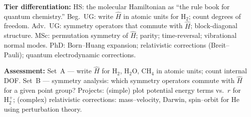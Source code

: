 \documentclass[11pt,a4paper]{article}
\begin{document}
\begin{tcolorbox}[chembox, title={Module~III.1 / L01: The Molecular Hamiltonian}]
\medskip\textbf{Tier differentiation:}
HS: the molecular Hamiltonian as ``the rule book for quantum chemistry.''
Beg.\ UG: write $\hat{H}$ in atomic units for H$_2$; count degrees of freedom.
Adv.\ UG: symmetry operators that commute with $\hat{H}$; block-diagonal structure.
MSc: permutation symmetry of $\hat{H}$; parity; time-reversal; vibrational normal modes.
PhD: Born--Huang expansion; relativistic corrections (Breit--Pauli); quantum electrodynamic corrections.

\medskip\textbf{Assessment:}
Set~A --- write $\hat{H}$ for H$_2$, H$_2$O, CH$_4$ in atomic units; count internal DOF.
Set~B --- symmetry analysis: which symmetry operators commute with $\hat{H}$ for a given point group?
Projects: (simple) plot potential energy terms vs.\ $r$ for H$_2^+$; (complex) relativistic corrections: mass--velocity, Darwin, spin--orbit for He using perturbation theory.
\end{tcolorbox}

\medskip
\end{document}

